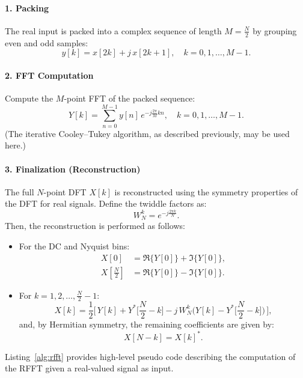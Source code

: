 \documentclass[12pt,letter]{article}
\begin{document}
\paragraph{1. Packing}
The real input is packed into a complex sequence of length \( M = \frac{N}{2} \) by grouping even and odd samples:
\begin{equation}
y[k] = x[2k] + j\,x[2k+1], \quad k = 0, 1, \dots, M-1.
\label{eq:packing}
\end{equation}

\paragraph{2. FFT Computation}
Compute the \( M \)-point FFT of the packed sequence:
\begin{equation}
Y[k] = \sum_{n=0}^{M-1} y[n] \, e^{-j \frac{2\pi}{M} k n}, \quad k = 0, 1, \dots, M-1.
\label{eq:fft-computation}
\end{equation}
(The iterative Cooley–Tukey algorithm, as described previously, may be used here.)

\paragraph{3. Finalization (Reconstruction)}
The full \( N \)-point DFT \( X[k] \) is reconstructed using the symmetry properties of the DFT for real signals. Define the twiddle factors as:
\[
W_N^k = e^{-j\frac{2\pi k}{N}}.
\]
Then, the reconstruction is performed as follows:
\begin{itemize}
  \item For the DC and Nyquist bins:
  \begin{align}
    X[0] &= \Re\{Y[0]\} + \Im\{Y[0]\}, \label{eq:dc}\\[1mm]
    X\left[\frac{N}{2}\right] &= \Re\{Y[0]\} - \Im\{Y[0]\}. \label{eq:nyquist}
  \end{align}
  \item For \( k = 1, 2, \dots, \frac{N}{2}-1 \):
  \begin{equation}
    X[k] = \frac{1}{2}\Big[\, Y[k] + Y^*\Big[\frac{N}{2}-k\Big] - j\,W_N^k\Big( Y[k] - Y^*\Big[\frac{N}{2}-k\Big] \Big)\,\Big],
    \label{eq:finalization}
  \end{equation}
  and, by Hermitian symmetry, the remaining coefficients are given by:
  \[
  X[N-k] = X[k]^*.
  \]
\end{itemize}

Listing~\ref{alg:rfft} provides high-level pseudo code describing the
computation of the RFFT given a real-valued signal as input.
\end{document}
